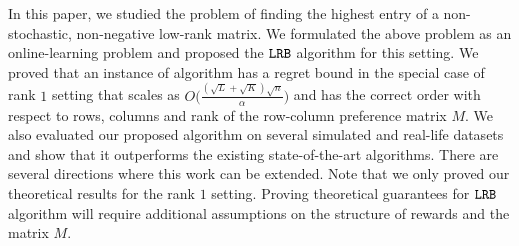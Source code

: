 In this paper, we studied the problem of finding the highest entry of a non-stochastic, non-negative low-rank matrix. We formulated the above problem as an online-learning problem and proposed the ${\tt LRB}$ algorithm for this setting. We proved that an instance of algorithm has a regret bound in the special case of rank $1$ setting that scales as $O\big(\frac{(\sqrt{L } + \sqrt{K }) \sqrt{n}}{\alpha}\big)$ and has the correct order with respect to rows, columns and rank of the row-column preference matrix $M$. We also evaluated our proposed algorithm on several simulated and real-life datasets and show that it outperforms the existing state-of-the-art algorithms. There are several directions where this work can be extended. Note that we only proved our theoretical results for the rank $1$ setting. Proving theoretical guarantees for ${\tt LRB}$ algorithm will require additional assumptions on the structure of rewards and the matrix $M$. 


